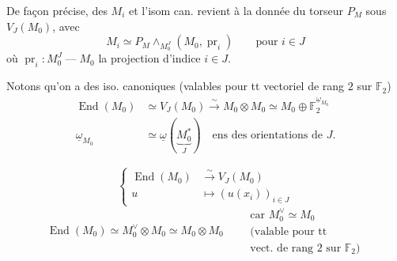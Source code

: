 
De façon précise,  des  $M_i$ et  l'isom can.  revient à la donnée du torseur $P_M$ sous $V_J(M_0)$, avec
\[
M_i\simeq P_M\wedge_{M_0^J}(M_0,\operatorname{pr}_i)\qquad\text{pour }i\in J \tag*{(9)}
\]
où $\operatorname{pr}_i:M_0^J\mathrel{\text{---}}M_0$ la projection d'indice $i\in J$.

Notons qu'on a des iso. canoniques (valables pour tt vectoriel de rang $2$ sur $\mathbb F_2$)
\[
\begin{aligned}
\operatorname{End}(M_0)&\simeq V_J(M_0)\xrightarrow{\sim}M_0\otimes M_0\simeq M_0\oplus\mathbb F_2^{\underline\omega_{M_0}}\\
\underline\omega_{M_0}&\simeq\underline\omega(\underset{J}{\underbrace{M_0^*}})\quad\text{ens des orientations de }J.
\end{aligned}\tag*{(10)}
\]


\[
\left\{\begin{aligned}
\operatorname{End}(M_0)&\xrightarrow{\sim}V_J(M_0)\\
u&\longmapsto(u(x_i))_{i\in J}
\end{aligned}\right. \tag*{(12)}
\]
\[
\operatorname{End}(M_0)\simeq M_0^\vee\otimes M_0\simeq M_0\otimes M_0
\qquad\substack{\text{car }M_0^\vee\simeq M_0\\\text{(valable pour tt}\\\text{vect. de rang }2\text{ sur }\mathbb F_2)}
\]


